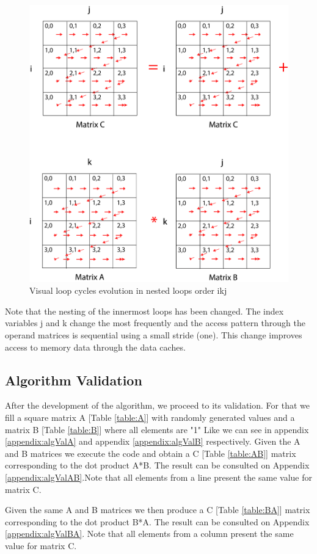 \documentclass{sigplanconf}
\begin{document}
\begin{figure}[H]
\centering
\includegraphics[width=0.9\columnwidth]{images/matrix_ikj_final.png}
\caption{Visual loop cycles evolution in nested loops order ikj}
\label{figure:loop_ikj}
\end{figure}

Note that the nesting of the innermost loops
has been changed. The index variables j and k
change the most frequently and the access
pattern through the operand matrices is
sequential using a small stride (one). This
change improves access to memory data through
the data caches. 



\subsection{Algorithm Validation}
After the development of the algorithm, we proceed to its validation. For that we fill a square matrix A [Table \ref{table:A}] with randomly generated values and a matrix B [Table \ref{table:B}] where all elements are "1" Like we can see in appendix \ref{appendix:algValA} and appendix \ref{appendix:algValB} respectively. Given the A and B matrices we execute the code and obtain a C [Table \ref{table:AB}] matrix corresponding to the dot product A*B. The result can be consulted on Appendix \ref{appendix:algValAB}.Note that all elements from a line present the same value for matrix C.\par 
Given the same A and B matrices we then produce a C [Table \ref{table:BA}] matrix corresponding to the dot product B*A. The result can be consulted on Appendix \ref{appendix:algValBA}. Note that all elements from a column present the same value for matrix C.
\end{document}
